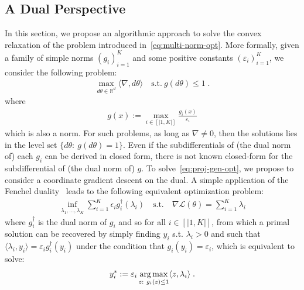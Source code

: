 \subsection{A Dual Perspective}


In this section, we propose an algorithmic approach to solve the convex relaxation of the problem introduced in~\eqref{eq:multi-norm-opt}. More formally, given a family of simple norms $(g_i)_{i=1}^K$ and some positive constants $(\varepsilon_i)_{i=1}^K$, we consider the following problem:
\begin{align}
\label{eq:proj-gen-opt}
 \max_{d\theta\in\mathbb{R}^d} \langle \nabla, d\theta\rangle\quad \text{s.t.}~g(d\theta)\leq 1\; .
\end{align}
where
\begin{align*}
g(x):= \max_{i\in[|1,K|]}\frac{g_i(x)}{\varepsilon_i}
\end{align*}
which is also a norm. For such problems, as long as $\nabla\neq 0$, then the solutions lies in the level set $\{d\theta:~g(d\theta)=1\}$. Even if the subdifferentials of (the dual norm of) each $g_i$ can be derived in closed form, there is not known closed-form for the subdifferential of (the dual norm of) $g$. To solve~\eqref{eq:proj-gen-opt}, we propose to consider a coordinate gradient descent on the dual. A simple application of the Fenchel duality~\cite{rockafellar1974conjugate} leads to the following equivalent optimization problem:
\begin{align}
\label{dual-gen-proj}
\inf_{\lambda_1,\dots,\lambda_K}\sum_{i=1}^K \epsilon_i g^\dagger_i(\lambda_i)\quad\text{s.t.}\quad \nabla\mathcal{L}(\theta) = \sum_{i=1}^K \lambda_i
\end{align}
where $g_i^{\dagger}$ is the dual norm of $g_i$ and so for all $i\in[|1,K|]$, from which a primal solution can be recovered by simply finding $y_i$ s.t. $\lambda_i>0$ and such that $\langle \lambda_i, y_i\rangle=\varepsilon_ig_i^{\dagger}(y_i)$ under the condition that $g_i(y_i)=\varepsilon_i$, which is equivalent to solve:
\begin{align*}
    y_i^{*}:=\varepsilon_i\operatorname*{arg\,max}_{z:~g_i(z)\leq 1} \langle z,\lambda_i\rangle \; .
\end{align*}


